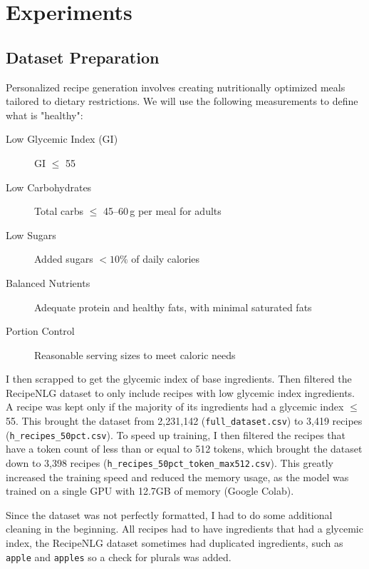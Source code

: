 \section{Experiments}

\subsection{Dataset Preparation}

Personalized recipe generation involves creating nutritionally optimized meals tailored to dietary restrictions. We will use the following measurements to define what is "healthy":

\begin{description}
	\item[Low Glycemic Index (GI)] GI $\leq$ 55
	\item[Low Carbohydrates] Total carbs $\leq$ 45--60\,g per meal for adults
	\item[Low Sugars] Added sugars $< 10\%$ of daily calories
	\item[Balanced Nutrients] Adequate protein and healthy fats, with minimal saturated fats
	\item[Portion Control] Reasonable serving sizes to meet caloric needs
\end{description}

I then scrapped \cite{foodstruct_glycemic_index} to get the glycemic index of base ingredients. Then filtered the RecipeNLG \cite{bien2020recipenlg} dataset to only include recipes with low glycemic index ingredients. A recipe was kept only if the majority of its ingredients had a glycemic index $\leq$ 55. This brought the dataset from 2,231,142 (\texttt{full\_dataset.csv}) to 3,419 recipes (\texttt{h\_recipes\_50pct.csv}). To speed up training, I then filtered the recipes that have a token count of less than or equal to 512 tokens, which brought the dataset down to 3,398 recipes (\texttt{h\_recipes\_50pct\_token\_max512.csv}). This greatly increased the training speed and reduced the memory usage, as the model was trained on a single GPU with 12.7GB of memory (Google Colab).

Since the dataset was not perfectly formatted, I had to do some additional cleaning in the beginning. All recipes had to have ingredients that had a glycemic index, the RecipeNLG dataset sometimes had duplicated ingredients, such as \texttt{apple} and \texttt{apples} so a check for plurals was added.

